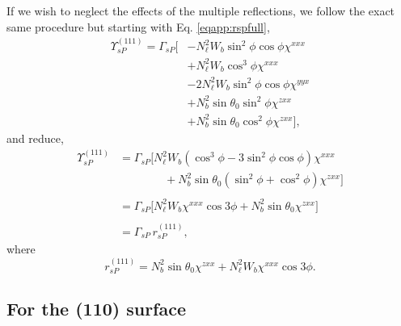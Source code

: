 If we wish to neglect the effects of the multiple reflections, we follow the
exact same procedure but starting with Eq. \eqref{eqapp:rspfull},
\begin{equation*}
\begin{split}
\Upsilon^{(111)}_{sP} =
\Gamma_{sP}
\big[
&- N^{2}_{\ell}W_{b}\sin^{2}\phi\cos\phi\chi^{xxx}\\
&+ N^{2}_{\ell}W_{b}\cos^{3}\phi\chi^{xxx}\\
&- 2N^{2}_{\ell}W_{b}\sin^{2}\phi\cos\phi\chi^{yyx}\\
&+ N^{2}_{b}\sin\theta_{0}\sin^{2}\phi\chi^{zxx}\\
&+ N^{2}_{b}\sin\theta_{0}\cos^{2}\phi\chi^{zxx}
\big],
\end{split}
\end{equation*}
and reduce,
\begin{equation*}
\begin{split}
\Upsilon^{(111)}_{sP} &=
\Gamma_{sP}
\big[
N^{2}_{\ell}W_{b}(\cos^{3}\phi - 3\sin^{2}\phi\cos\phi)\chi^{xxx}\\
&\qquad\qquad+ N^{2}_{b}\sin\theta_{0}(\sin^{2}\phi + \cos^{2}\phi)\chi^{zxx}
\big]\\\\
&=
\Gamma_{sP}
\big[
N^{2}_{\ell}W_{b}\chi^{xxx}\cos3\phi + N^{2}_{b}\sin\theta_{0}\chi^{zxx}
\big]\\\\
&= \Gamma_{sP}\,r^{(111)}_{sP},
\end{split}
\end{equation*}
where
\begin{equation}\label{eqapp:final-rsp.111}
r^{(111)}_{sP} = 
N^{2}_{b}\sin\theta_{0}\chi^{zxx} + N^{2}_{\ell}W_{b}\chi^{xxx}\cos3\phi.
\end{equation}


\subsection{For the (110) surface}

